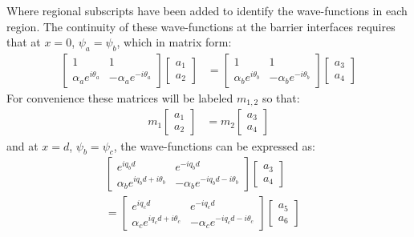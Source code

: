 \documentclass[prl,twocolumn,aps,superscriptaddress,floatfix,10pt]{revtex4}
\begin{document}
Where regional subscripts have been added to identify the wave-functions in each region. The continuity of these wave-functions at the barrier interfaces requires that at $x=0$, $\psi_{a}=\psi_{b}$, which in matrix form:
		\begin{align}
			\left[\begin{array}{ccc}
				1&1\\
				\alpha_{a}e^{i\theta_{a}}&-\alpha_{a}e^{-i\theta_{a}}
			\end{array}\right]
			\left[\begin{array}{ccc}
				a_{1}\\
				a_{2}
			\end{array}\right]
			&=
			\left[\begin{array}{ccc}
				1&1\\
				\alpha_{b}e^{i\theta_{b}}&-\alpha_{b}e^{-i\theta_{b}}
			\end{array}\right]
			\left[\begin{array}{ccc}
				a_{3}\\
				a_{4}
			\end{array}\right]
		\end{align}
		For convenience these matrices will be labeled $m_{1,2}$ so that:
		\begin{align}
			m_{1}\left[\begin{array}{ccc}
				a_{1}\\
				a_{2}
			\end{array}\right]
			&=
			m_{2}\left[\begin{array}{ccc}
				a_{3}\\
				a_{4}
			\end{array}\right]
		\end{align}
and at $x=d$, $\psi_{b}=\psi_{c}$, the wave-functions can be expressed as:
		\begin{align}
			\left[\begin{array}{ccc}
				e^{iq_{b}d}&e^{-iq_{b}d}\\
				\alpha_{b}e^{iq_{b}d+i\theta_{b}}&-\alpha_{b}e^{-iq_{b}d-i\theta_{b}}
			\end{array}\right]
			\left[\begin{array}{ccc}
				a_{3}\\
				a_{4}
			\end{array}\right]
			\hspace{1cm}\\
			=
			\left[\begin{array}{ccc}
				e^{iq_{c}d}&e^{-iq_{c}d}\\
				\alpha_{c}e^{iq_{c}d+i\theta_{c}}&-\alpha_{c}e^{-iq_{c}d-i\theta_{c}}
			\end{array}\right]
			\left[\begin{array}{ccc}
				a_{5}\\
				a_{6}
			\end{array}\right]
		\end{align}
\end{document}
